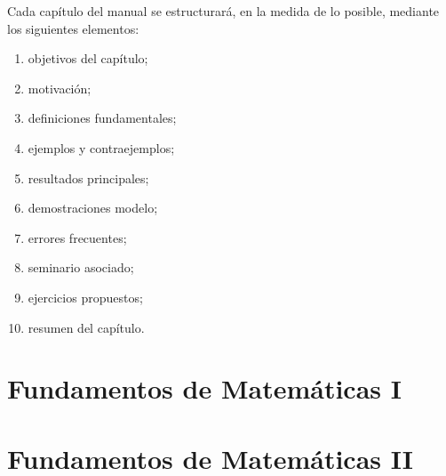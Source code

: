 \documentclass[11pt,a4paper,openany]{book}
\begin{document}
Cada capítulo del manual se estructurará, en la medida de lo posible, mediante los siguientes elementos:

\begin{enumerate}[leftmargin=2.5em]
  \item objetivos del capítulo;
  \item motivación;
  \item definiciones fundamentales;
  \item ejemplos y contraejemplos;
  \item resultados principales;
  \item demostraciones modelo;
  \item errores frecuentes;
  \item seminario asociado;
  \item ejercicios propuestos;
  \item resumen del capítulo.
\end{enumerate}

\mainmatter
\part{Fundamentos de Matemáticas I}







\part{Fundamentos de Matemáticas II}





\end{document}
